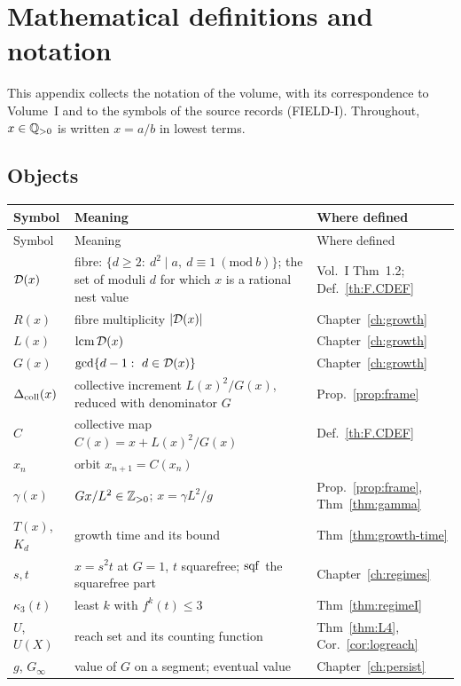 \chapter{Mathematical definitions and notation}\label{app:notation}

This appendix collects the notation of the volume, with its correspondence to Volume~I and to the symbols of the source records (FIELD-I). Throughout, \(x\in\mathbb{Q}_{>0}\) is written \(x=a/b\) in lowest terms.

\section{Objects}

\footnotesize
\begin{longtable}{@{}p{26mm}p{70mm}p{30mm}@{}}
\toprule Symbol & Meaning & Where defined\\\midrule\endfirsthead
\toprule Symbol & Meaning & Where defined\\\midrule\endhead
\(\mathcal{D}(x)\) & fibre: \(\{d\ge2:\ d^2\mid a,\ d\equiv1\ (\mathrm{mod}\ b)\}\); the set of moduli \(d\) for which \(x\) is a rational nest value & Vol.~I Thm~1.2; Def.~\ref{th:F.CDEF}\\
\(R(x)\) & fibre multiplicity \(|\mathcal{D}(x)|\) & Chapter~\ref{ch:growth}\\
\(L(x)\) & \(\mathrm{lcm}\,\mathcal{D}(x)\) & Chapter~\ref{ch:growth}\\
\(G(x)\) & \(\gcd\{d-1:\ d\in\Dx(x)\}\) & Chapter~\ref{ch:growth}\\
\(\Delta_{\mathrm{coll}}(x)\) & collective increment \(L(x)^2/G(x)\), reduced with denominator \(G\) & Prop.~\ref{prop:frame}\\
\(C\) & collective map \(C(x)=x+L(x)^2/G(x)\) & Def.~\ref{th:F.CDEF}\\
\(x_n\) & orbit \(x_{n+1}=C(x_n)\) & \\
\(\gamma(x)\) & \(Gx/L^2\in\mathbb{Z}_{>0}\); \(x=\gamma L^2/g\) & Prop.~\ref{prop:frame}, Thm~\ref{thm:gamma}\\
\(T(x)\), \(K_d\) & growth time and its bound & Thm~\ref{thm:growth-time}\\
\(s,t\) & \(x=s^2t\) at \(G=1\), \(t\) squarefree; \(\operatorname{sqf}\) the squarefree part & Chapter~\ref{ch:regimes}\\
\(\kappa_3(t)\) & least \(k\) with \(f^k(t)\le3\) & Thm~\ref{thm:regimeI}\\
\(U\), \(U(X)\) & reach set and its counting function & Thm~\ref{thm:L4}, Cor.~\ref{cor:logreach}\\
\(g\), \(G_\infty\) & value of \(G\) on a segment; eventual value & Chapter~\ref{ch:persist}\\

\end{longtable}
